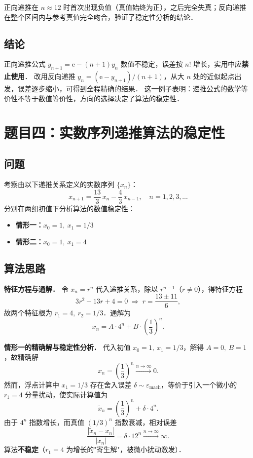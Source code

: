 \documentclass[UTF8,a4paper,11pt]{article}
\begin{document}
正向递推在 $n \approx 12$ 时首次出现负值（真值始终为正），之后完全失真；反向递推在整个区间内与参考真值完全吻合，验证了稳定性分析的结论．

\subsection{结论}

正向递推公式 $y_{n+1} = \mathrm{e} - (n+1)y_n$ 数值不稳定，误差按 $n!$ 增长，实用中应\textbf{禁止使用}．
改用反向递推 $y_n = (\mathrm{e} - y_{n+1})/(n+1)$，从大 $n$ 处的近似起点出发，误差逐步缩小，可得到全程精确的结果．
这一例子表明：递推公式的数学等价性不等于数值等价性，方向的选择决定了算法的稳定性．

\clearpage

\section{题目四：实数序列递推算法的稳定性}

\subsection{问题}

考察由以下递推关系定义的实数序列 $\{x_n\}$：
$$x_{n+1} = \frac{13}{3}\,x_n - \frac{4}{3}\,x_{n-1}, \quad n = 1, 2, 3, \ldots$$
分别在两组初值下分析算法的数值稳定性：
\begin{itemize}
  \item \textbf{情形一：}$x_0 = 1,\ x_1 = 1/3$
  \item \textbf{情形二：}$x_0 = 1,\ x_1 = 4$
\end{itemize}

\subsection{算法思路}

\noindent\textbf{特征方程与通解．}
令 $x_n = r^n$ 代入递推关系，除以 $r^{n-1}$（$r \ne 0$），得特征方程
$$3r^2 - 13r + 4 = 0 \;\Longrightarrow\; r = \frac{13 \pm 11}{6},$$
故两个特征根为 $r_1 = 4,\ r_2 = 1/3$．通解为
$$x_n = A \cdot 4^n + B \cdot \left(\frac{1}{3}\right)^n.$$

\noindent\textbf{情形一的精确解与稳定性分析．}
代入初值 $x_0 = 1,\ x_1 = 1/3$，解得 $A = 0,\ B = 1$，故精确解
$$x_n = \left(\frac{1}{3}\right)^n \xrightarrow{n\to\infty} 0.$$
然而，浮点计算中 $x_1 = 1/3$ 存在舍入误差 $\delta \sim \varepsilon_{\mathrm{mach}}$，等价于引入一个微小的 $r_1 = 4$ 分量扰动，使实际计算值为
$$\tilde{x}_n = \left(\frac{1}{3}\right)^n + \delta \cdot 4^n.$$
由于 $4^n$ 指数增长，而真值 $(1/3)^n$ 指数衰减，相对误差
$$\frac{|\tilde{x}_n - x_n|}{|x_n|} = \delta \cdot 12^n \xrightarrow{n\to\infty} \infty.$$
算法\textbf{不稳定}（$r_1 = 4$ 为增长的"寄生解"，被微小扰动激发）．
\end{document}
